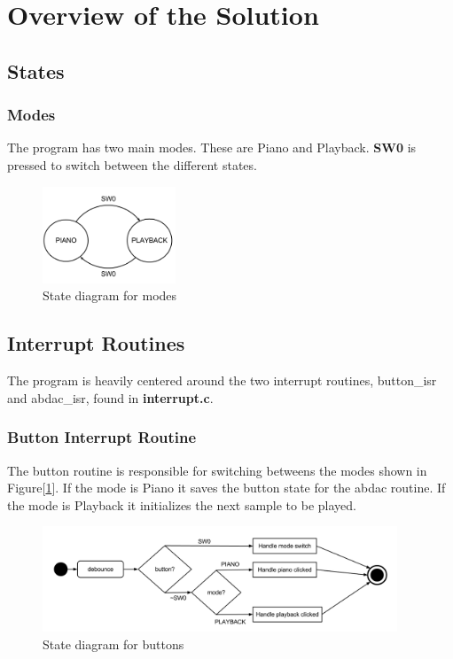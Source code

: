 \section{Overview of the Solution}

\subsection{States}

\subsubsection{Modes}

The program has two main modes. These are Piano and Playback.
\textbf{SW0} is pressed to switch between the different states.

\begin{figure}[h]
  \centerline{\includegraphics[width=150px]{mode.png}}
  \caption{State diagram for modes}
  \label{modestates}
\end{figure}

\subsection{Interrupt Routines}
The program is heavily centered around the two interrupt routines, button\_isr and abdac\_isr, found in
\textbf{interrupt.c}.

\subsubsection{Button Interrupt Routine}
The button routine is responsible for switching betweens the modes shown in Figure[\ref{modestates}].
If the mode is Piano it saves the button state for the abdac routine. If the mode is Playback it initializes
the next sample to be played.
\begin{figure}[h]
  \centerline{\includegraphics[width=400px]{button_isr.png}}
  \caption{State diagram for buttons}
\end{figure}
\newpage
